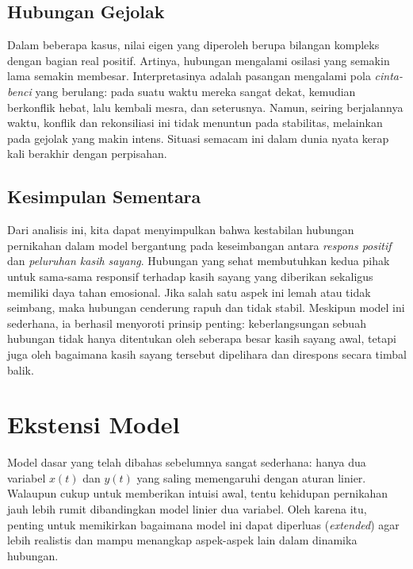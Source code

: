 \documentclass{bukumjh}
\begin{document}
\subsection*{Hubungan Gejolak}
Dalam beberapa kasus, nilai eigen yang diperoleh berupa bilangan kompleks dengan bagian real positif. 
Artinya, hubungan mengalami osilasi yang semakin lama semakin membesar. 
Interpretasinya adalah pasangan mengalami pola \emph{cinta-benci} yang berulang: pada suatu waktu mereka sangat dekat, kemudian berkonflik hebat, lalu kembali mesra, dan seterusnya. 
Namun, seiring berjalannya waktu, konflik dan rekonsiliasi ini tidak menuntun pada stabilitas, melainkan pada gejolak yang makin intens. 
Situasi semacam ini dalam dunia nyata kerap kali berakhir dengan perpisahan.

\subsection*{Kesimpulan Sementara}
Dari analisis ini, kita dapat menyimpulkan bahwa kestabilan hubungan pernikahan dalam model bergantung pada keseimbangan antara \emph{respons positif} dan \emph{peluruhan kasih sayang}. 
Hubungan yang sehat membutuhkan kedua pihak untuk sama-sama responsif terhadap kasih sayang yang diberikan sekaligus memiliki daya tahan emosional. 
Jika salah satu aspek ini lemah atau tidak seimbang, maka hubungan cenderung rapuh dan tidak stabil. 
Meskipun model ini sederhana, ia berhasil menyoroti prinsip penting: keberlangsungan sebuah hubungan tidak hanya ditentukan oleh seberapa besar kasih sayang awal, tetapi juga oleh bagaimana kasih sayang tersebut dipelihara dan direspons secara timbal balik.

\section{Ekstensi Model}

Model dasar yang telah dibahas sebelumnya sangat sederhana: hanya dua variabel $x(t)$ dan $y(t)$ yang saling memengaruhi dengan aturan linier. 
Walaupun cukup untuk memberikan intuisi awal, tentu kehidupan pernikahan jauh lebih rumit dibandingkan model linier dua variabel. 
Oleh karena itu, penting untuk memikirkan bagaimana model ini dapat diperluas (\emph{extended}) agar lebih realistis dan mampu menangkap aspek-aspek lain dalam dinamika hubungan.
\end{document}
